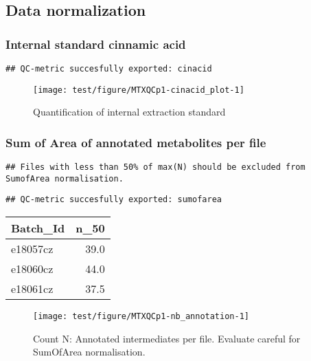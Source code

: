 \documentclass[9pt,]{article}
\begin{document}
\subsection{Data normalization}\label{data-normalization}

\subsubsection{Internal standard cinnamic
acid}\label{internal-standard-cinnamic-acid}

\begin{verbatim}
## QC-metric succesfully exported: cinacid
\end{verbatim}

\begin{figure}

{\centering \texttt{[image: test/figure/MTXQCp1-cinacid\_plot-1]} 

}

\caption{Quantification of internal extraction standard}\label{fig:cinacid_plot}
\end{figure}

\subsubsection{Sum of Area of annotated metabolites per
file}\label{sum-of-area-of-annotated-metabolites-per-file}

\begin{verbatim}
## Files with less than 50% of max(N) should be excluded from SumofArea normalisation.
\end{verbatim}

\begin{verbatim}
## QC-metric succesfully exported: sumofarea
\end{verbatim}

\begin{longtable}[]{@{}lr@{}}
\toprule
Batch\_Id & n\_50\tabularnewline
\midrule
\endhead
e18057cz & 39.0\tabularnewline
e18060cz & 44.0\tabularnewline
e18061cz & 37.5\tabularnewline
\bottomrule
\end{longtable}

\begin{figure}

{\centering \texttt{[image: test/figure/MTXQCp1-nb\_annotation-1]} 

}

\caption{Count N: Annotated intermediates per file. Evaluate careful for SumOfArea normalisation.}\label{fig:nb_annotation}
\end{figure}
\end{document}
